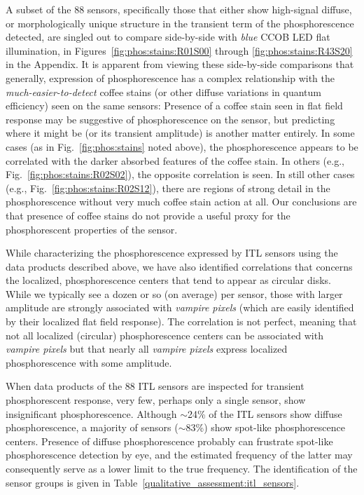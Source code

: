 A subset of the 88 sensors, specifically those that either show high-signal diffuse, or morphologically unique structure in the transient term of the phosphorescence detected, are singled out to compare side-by-side with {\it blue} CCOB LED flat illumination, in Figures~\ref{fig:phos:stains:R01S00} through \ref{fig:phos:stains:R43S20} in the Appendix. It is apparent from viewing these side-by-side comparisons that generally, expression of phosphorescence has a complex relationship with the {\it much-easier-to-detect} coffee stains (or other diffuse variations in quantum efficiency) seen on the same sensors: Presence of a coffee stain seen in flat field response may be suggestive of phosphorescence on the sensor, but predicting where it might be (or its transient amplitude) is another matter entirely. In some cases (as in Fig.~\ref{fig:phos:stains} noted above), the phosphorescence appears to be correlated with the darker absorbed features of the coffee stain. In others (e.g., Fig.~\ref{fig:phos:stains:R02S02}), the opposite correlation is seen. In still other cases (e.g., Fig.~\ref{fig:phos:stains:R02S12}), there are regions of strong detail in the phosphorescence without very much coffee stain action at all. Our conclusions are that presence of coffee stains do not provide a useful proxy for the phosphorescent properties of the sensor.




While characterizing the phosphorescence expressed by ITL sensors using the data products described above, we have also identified correlations that concerns the localized, phosphorescence centers that tend to appear as circular disks. While we typically see a dozen or so (on average) per sensor, those with larger amplitude are strongly associated with {\it vampire pixels} (which are easily identified by their localized flat field response). The correlation is not perfect, meaning that not all localized (circular) phosphorescence centers can be associated with {\it vampire pixels} but that nearly all {\it vampire pixels} express localized phosphorescence with some amplitude. 

When data products of the 88 ITL sensors are inspected for transient phosphorescent response, very few, perhaps only a single sensor, show insignificant phosphorescence. Although $\sim$24\% of the ITL sensors show diffuse phosphorescence, a majority of sensors ($\sim$83\%) show spot-like phosphorescence centers. Presence of diffuse phosphorescence probably can frustrate spot-like phosphorescence detection by eye, and the estimated frequency of the latter may consequently serve as a lower limit to the true frequency. The identification of the sensor groups is given in Table~\ref{qualitative_assessment:itl_sensors}.

